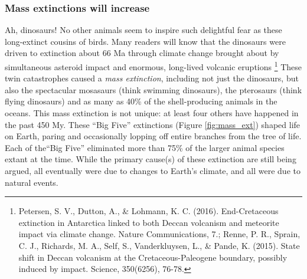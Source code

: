 \documentclass[amstex,12pt]{book}
\begin{document}
\subsubsection{Mass extinctions will increase}
Ah, dinosaurs! No other animals seem to inspire such delightful fear as these long-extinct cousins of birds. Many readers will know that the dinosaurs were driven to extinction about 66 Ma through climate change brought about by simultaneous asteroid impact and enormous, long-lived volcanic eruptions \footnote{Petersen, S. V., Dutton, A., \& Lohmann, K. C. (2016). End-Cretaceous extinction in Antarctica linked to both Deccan volcanism and meteorite impact via climate change. Nature Communications, 7.; Renne, P. R., Sprain, C. J., Richards, M. A., Self, S., Vanderkluysen, L., \& Pande, K. (2015). State shift in Deccan volcanism at the Cretaceous-Paleogene boundary, possibly induced by impact. Science, 350(6256), 76-78.} These twin catastrophes caused a \emph{mass extinction}, including not just the dinosaurs, but also the spectacular mosasaurs (think swimming dinosaurs), the pterosaurs (think flying dinosaurs) and as many as 40\% of the shell-producing animals in the oceans. This mass extinction is not unique: at least four others have happened in the past 450 My. These ``Big Five'' extinctions (Figure \ref{fig:mass_ext}) shaped life on Earth, paring and occasionally lopping off entire branches from the tree of life. Each of the``Big Five'' eliminated more than 75\% of the larger animal species extant at the time. While the primary cause(s) of these extinction are still being argued, all eventually were due to changes to Earth's climate, and all were due to natural events.\\ 
\end{document}
